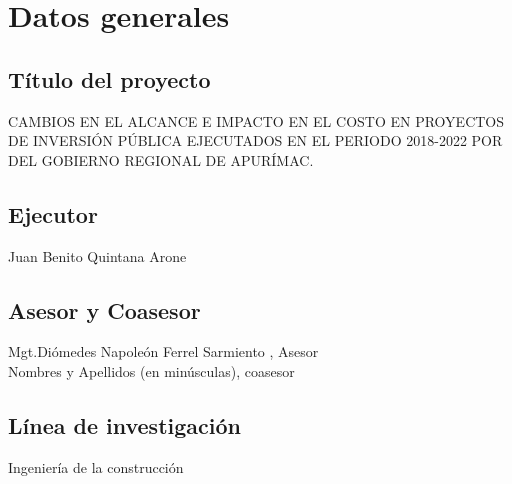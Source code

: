 \newpage
\pagestyle{plain}

\chapter*{Datos generales}


\section*{Título del proyecto}
CAMBIOS EN EL ALCANCE E IMPACTO EN EL COSTO EN PROYECTOS DE INVERSIÓN PÚBLICA EJECUTADOS EN EL PERIODO 2018-2022 POR DEL GOBIERNO REGIONAL DE APURÍMAC. 

\section*{Ejecutor} 
\noindent Juan Benito Quintana Arone

\section*{Asesor y Coasesor}
\noindent Mgt.Diómedes Napoleón Ferrel Sarmiento , Asesor\\
Nombres y Apellidos (en minúsculas), coasesor

\section*{Línea de investigación}
\noindent Ingeniería de la construcción

\newpage

